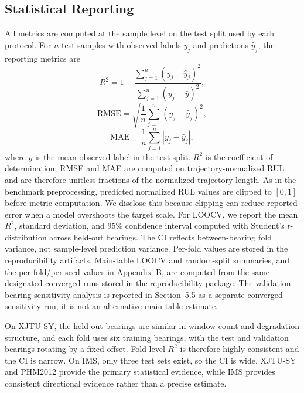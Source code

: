 \documentclass[pdflatex,sn-basic,NameDate]{sn-jnl}
\begin{document}
\subsection{Statistical Reporting}
All metrics are computed at the sample level on the test split used by each protocol. For $n$ test samples with observed labels $y_j$ and predictions $\hat y_j$, the reporting metrics are
\begin{equation}
R^2 = 1 - \frac{\sum_{j=1}^{n}(y_j-\hat y_j)^2}{\sum_{j=1}^{n}(y_j-\bar y)^2},
\label{eq:r2}
\end{equation}
\begin{equation}
\mathrm{RMSE} = \sqrt{\frac{1}{n}\sum_{j=1}^{n}(y_j-\hat y_j)^2},
\label{eq:rmse}
\end{equation}
\begin{equation}
\mathrm{MAE} = \frac{1}{n}\sum_{j=1}^{n}|y_j-\hat y_j|,
\label{eq:mae}
\end{equation}
where $\bar y$ is the mean observed label in the test split. $R^2$ is the coefficient of determination; RMSE and MAE are computed on trajectory-normalized RUL and are therefore unitless fractions of the normalized trajectory length.
As in the benchmark preprocessing, predicted normalized RUL values are clipped to $[0,1]$ before metric computation. We disclose this because clipping can reduce reported error when a model overshoots the target scale.
For LOOCV, we report the mean $R^2$, standard deviation, and 95\% confidence interval computed with Student's $t$-distribution across held-out bearings. The CI reflects between-bearing fold variance, not sample-level prediction variance. Per-fold values are stored in the reproducibility artifacts. Main-table LOOCV and random-split summaries, and the per-fold/per-seed values in Appendix~B, are computed from the same designated converged runs stored in the reproducibility package. The validation-bearing sensitivity analysis is reported in Section~5.5 as a separate converged sensitivity run; it is not an alternative main-table estimate.

On XJTU-SY, the held-out bearings are similar in window count and degradation structure, and each fold uses six training bearings, with the test and validation bearings rotating by a fixed offset. Fold-level $R^2$ is therefore highly consistent and the CI is narrow. On IMS, only three test sets exist, so the CI is wide. XJTU-SY and PHM2012 provide the primary statistical evidence, while IMS provides consistent directional evidence rather than a precise estimate.
\end{document}
